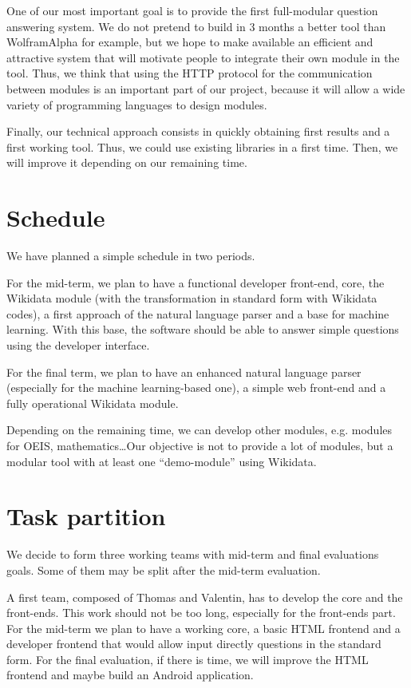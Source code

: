 \documentclass[a4paper,10pt]{article}
\begin{document}
One of our most important goal is to provide the first full-modular question 
answering system. We do not pretend to build in 3 months a better tool than 
WolframAlpha for example, but we hope to make available an efficient and 
attractive system that will motivate people to integrate their own module in the 
tool. Thus, we think that using the HTTP protocol for the communication between 
modules is an important part of our project, because it will allow a wide variety 
of programming languages to design modules.

Finally, our technical approach consists in quickly obtaining first results and 
a first working tool. Thus, we could use existing libraries in a first time. Then, 
we will improve it depending on our remaining time.

\section{Schedule}

We have planned a simple schedule in two periods.

For the mid-term, we plan to have a functional developer front-end, core, the 
Wikidata module (with the transformation in standard form with Wikidata codes), 
a first approach of the natural language parser and a base for machine learning. 
With this base, the software should be able to answer simple questions using the 
developer interface.

For the final term, we plan to have an enhanced natural language parser (especially 
for the machine learning-based one), a simple web front-end and a fully operational 
Wikidata module.

Depending on the remaining time, we can develop other modules, e.g. modules for 
OEIS, mathematics\ldots Our objective is not to provide a lot of modules, but a 
modular tool with at least one ``demo-module'' using Wikidata.

\section{Task partition}

We decide to form three working teams with mid-term and final evaluations goals. Some of them
may be split after the mid-term evaluation.

A first team, composed of Thomas and Valentin, has to develop the core and the front-ends.
This work should not be too long, especially for the front-ends part. For the mid-term
we plan to have a working core, a basic HTML frontend and a developer frontend that would
allow input directly questions in the standard form. For the final evaluation, if there is time,
we will improve the HTML frontend and maybe build an Android application.
\end{document}
